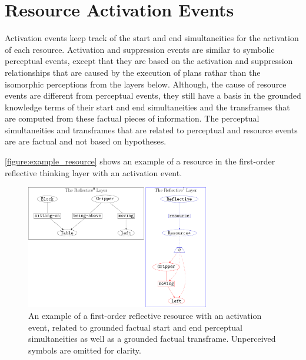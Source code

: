 \section{Resource Activation Events}

Activation events keep track of the start and end simultaneities for
the activation of each resource.  Activation and suppression events
are similar to symbolic perceptual events, except that they are based
on the activation and suppression relationships that are caused by the
execution of plans rathar than the isomorphic perceptions from the
layers below.  Although, the cause of resource events are different
from perceptual events, they still have a basis in the grounded
knowledge terms of their start and end simultaneities and the
transframes that are computed from these factual pieces of
information.  The perceptual simultaneities and transframes that are
related to perceptual and resource events are are factual and not
based on hypotheses.

{\mbox{\autoref{figure:example_resource}}} shows an example of a
resource in the first-order reflective thinking layer with an
activation event.
\begin{figure}
\center
\includegraphics[width=8cm]{gfx/example_resource}
\caption[An example of a first-order reflective resource with an
  activation event.]{An example of a first-order reflective resource
  with an activation event, related to grounded factual start and end
  perceptual simultaneities as well as a grounded factual transframe.
  Unperceived symbols are omitted for clarity.}
\label{figure:example_resource}
\end{figure}

